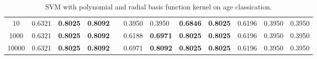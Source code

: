 \documentclass[a4paper]{llncs}
\begin{document}
\begin{table}[!htbp]
\begin{tabular}{|c|lll|l|lllllll|}
10                 & 0.6321                 & \textbf{0.8025}        & \textbf{0.8092}        &                       & 0.3950                      & 0.3950                     & \textbf{0.6846}          & \textbf{0.8025}        & 0.6196                  & 0.3950                    & 0.3950                     \\ %
1000               & 0.6321                 & \textbf{0.8025}        & \textbf{0.8092}        &                       & 0.6188                      & \textbf{0.6971}            & \textbf{0.8025}          & \textbf{0.8025}        & 0.6196                  & 0.3950                    & 0.3950                     \\ %
10000              & 0.6321                 & \textbf{0.8025}        & \textbf{0.8092}        &                       & 0.6971                      & \textbf{0.8092}            & \textbf{0.8025}          & \textbf{0.8025}        & 0.6196                  & 0.3950                    & 0.3950                     \\ \cline{1-4} \cline{6-12} 
\end{tabular}
\caption{SVM with polynomial and radial basis function kernel on age classication.}
\label{table:SVMPolyAndRBFAge}
\end{table}

\end{document}
